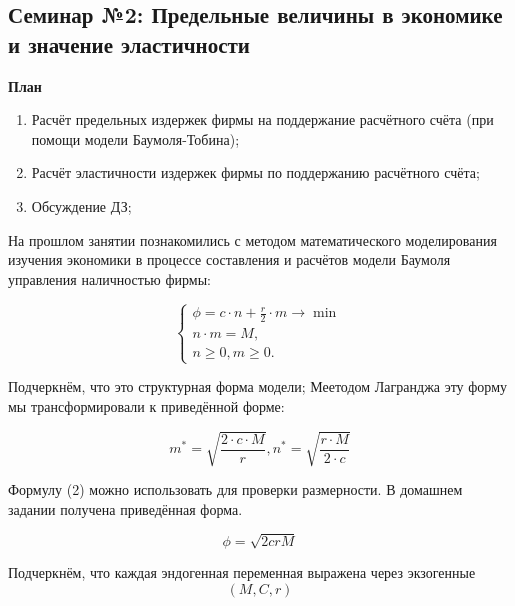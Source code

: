 \documentclass[12pt,a4paper]{article}
\author{GH-TIMe}
\begin{document}
\begin{center}
\section*{Семинар №2: Предельные величины в экономике и значение эластичности}
\end{center}

\begin{center}
\textbf{План}
\end{center}
\begin{enumerate}
\item Расчёт предельных издержек фирмы на поддержание расчётного счёта (при помощи модели Баумоля-Тобина);
\item Расчёт эластичности издержек фирмы по поддержанию расчётного счёта;
\item Обсуждение ДЗ;
\end{enumerate}

На прошлом занятии познакомились с методом математического моделирования изучения экономики в процессе составления и расчётов модели Баумоля управления наличностью фирмы:

\begin{equation}
	\begin{cases}
	\phi = c \cdot n + \displaystyle{\frac{r}{2}} \cdot m \rightarrow \min \\
	n \cdot m = M, \\
	n \geq 0, m \geq 0.
	\end{cases}
\end{equation}

Подчеркнём, что это структурная форма модели; Меетодом Лагранджа эту форму мы трансформировали к приведённой форме:

\begin{equation}
m^*=\sqrt{\displaystyle{\frac{2 \cdot c \cdot M}{r}}}, n^*=\sqrt{\displaystyle{\frac{r \cdot M}{2 \cdot c}}}
\end{equation}

Формулу (2) можно использовать для проверки размерности. В домашнем задании получена приведённая форма. 

\begin{equation}
\phi = \sqrt{2crM}
\end{equation}

Подчеркнём, что каждая эндогенная переменная выражена через экзогенные 
\begin{equation}
(M, C, r)
\end{equation}
\end{document}
